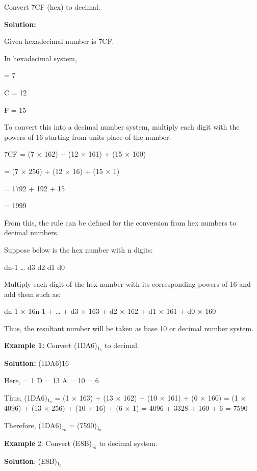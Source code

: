 \documentclass[pstricks,border=11pt]{article}
\begin{document}
\hfill \break
Convert 7CF (hex) to decimal.

\hfill \break
\textbf{Solution:}

\hfill \break
Given hexadecimal number is 7CF.

\hfill \break
In hexadecimal system,

\hfill {} = 7

\hfill \break
C = 12

\hfill \break
F = 15

\hfill \break
To convert this into a decimal number system, multiply each digit with the powers of 16 starting from units place of the number.

\hfill \break
7CF = (7 × 162) + (12 × 161) + (15 × 160)

\hfill \break
= (7 × 256) + (12 × 16) + (15 × 1)

\hfill \break
= 1792 + 192 + 15

\hfill \break
= 1999

\hfill \break
From this, the rule can be defined for the conversion from hex numbers to decimal numbers.

\hfill \break
Suppose below is the hex number with n digits:

\hfill \break
dn-1 … d3 d2 d1 d0

\hfill \break
Multiply each digit of the hex number with its corresponding powers of 16 and add them such as:

\hfill \break
dn-1 × 16n-1 + … + d3 × 163 + d2 × 162 + d1 × 161 + d0 × 160

\hfill \break
Thus, the resultant number will be taken as base 10 or decimal number system.

\hfill \break
\textbf{Example 1:}
\hfill \break
Convert (1DA6)$_1_6$ to decimal.

\hfill \break
\textbf{Solution:}
\hfill \break
(1DA6)16

\hfill \break
Here,
\hfill {} = 1
\hfill \break
D = 13
\hfill \break
A = 10
\hfill {} = 6

\hfill \break
Thus,
\hfill \break
(1DA6)$_1_6$ = (1 × 163) + (13 × 162) + (10 × 161) + (6 × 160)
\hfill \break
= (1 × 4096) + (13 × 256) + (10 × 16) + (6 × 1)
\hfill \break
= 4096 + 3328 + 160 + 6
\hfill \break
= 7590

\hfill \break
Therefore, (1DA6)$_1_6$ = (7590)$_1_0$

\hfill \break
\textbf{Example} 2:
\hfill \break
Convert (E8B)$_1_6$ to decimal system.

\hfill \break
\textbf{Solution}:
\hfill \break
(E8B)$_1_6$
\end{document}
